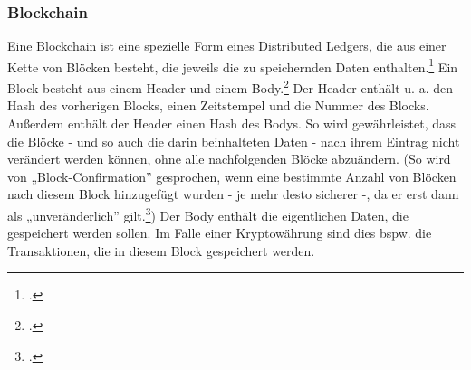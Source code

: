 \subsubsection{Blockchain}
\label{sec:definition-blockchain}
Eine Blockchain ist eine spezielle Form eines Distributed Ledgers, die aus einer Kette von Blöcken besteht, die jeweils die zu speichernden Daten enthalten.\footcite[Vgl.][16]{q3} 
Ein Block besteht aus einem Header und einem Body.\footcites[Vgl. hierzu und im Folgenden][S. 161 ff\adddot]{q5}[]{w9}
\bigbreak
\noindent
Der Header enthält u. a. den Hash des vorherigen Blocks, einen Zeitstempel und die Nummer des Blocks.
Außerdem enthält der Header einen Hash des Bodys.
So wird gewährleistet, dass die Blöcke - und so auch die darin beinhalteten Daten - nach ihrem Eintrag nicht verändert werden können, ohne alle nachfolgenden Blöcke abzuändern. 
(So wird von „Block-Confirmation” gesprochen, wenn eine bestimmte Anzahl von Blöcken nach diesem Block hinzugefügt wurden - je mehr desto sicherer -, da er erst dann als „unveränderlich” gilt.\footcites[Vgl.][191]{q5})
\bigbreak
\noindent
Der Body enthält die eigentlichen Daten, die gespeichert werden sollen. Im Falle einer Kryptowährung sind dies bspw. die Transaktionen, die in diesem Block gespeichert werden.